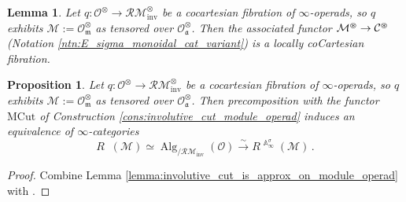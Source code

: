 \documentclass{article}
\DeclareMathOperator{\Alg}{Alg}
\DeclareMathOperator{\Modh}{{}^{\sigma}Mod} %
\renewcommand{\AA}{\mathbb{A}}
\newtheorem{proposition}[theorem]{Proposition}
\newtheorem{lemma}[theorem]{Lemma}
\theoremstyle{definition}
\begin{document}
\begin{lemma} %
    Let $ q \colon \mathcal{O}^\otimes \to \mathcal{RM}^\otimes_{\mathrm{inv}} $ be a cocartesian fibration of $ \infty $-operads, so $ q $ exhibits $ \mathcal{M}:= \mathcal{O}^\otimes_{\mathfrak{m}} $ as tensored over $ \mathcal{O}^\otimes_{\mathfrak{a}} $. 
    Then the associated functor $ \mathcal{M}^\varoast  \to \mathcal{C}^\varoast $ (Notation \ref{ntn:E_sigma_monoidal_cat_variant}) is a locally coCartesian fibration.     
\end{lemma}
\begin{proposition}
    Let $ q \colon \mathcal{O}^\otimes \to \mathcal{RM}^\otimes_{\mathrm{inv}} $ be a cocartesian fibration of $ \infty $-operads, so $ q $ exhibits $ \mathcal{M}:= \mathcal{O}^\otimes_{\mathfrak{m}} $ as tensored over $ \mathcal{O}^\otimes_{\mathfrak{a}} $. 
    Then precomposition with the functor $ \mathrm{MCut} $ of Construction \ref{cons:involutive_cut_module_operad} induces an equivalence of $ \infty $-categories
    \begin{equation*}
        R\Modh(\mathcal{M}) \simeq \Alg_{/\mathcal{RM}_{\mathrm{inv}}}(\mathcal{O}) \xrightarrow{\sim} R\Modh^{\AA_\infty^\sigma}\left(\mathcal{M}\right)\,.
    \end{equation*}
\end{proposition}
\begin{proof}
    Combine Lemma \ref{lemma:involutive_cut_is_approx_on_module_operad} with \cite[Theorem 2.3.3.23]{LurHA}. 
\end{proof}
\end{document}
